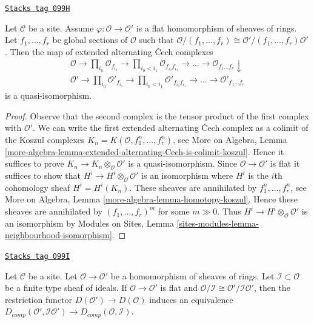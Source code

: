\begin{lemma}
\label{algebraization-lemma-map-identifies-koszul-and-cech-complexes}
\href{https://stacks.math.columbia.edu/tag/099H}{\texttt{Stacks tag 099H}}

Let $\mathcal{C}$ be a site.
Assume $\varphi : \mathcal{O} \to \mathcal{O}'$ is a flat homomorphism
of sheaves of rings. Let $f_1, \ldots, f_r$ be global sections
of $\mathcal{O}$ such that $\mathcal{O}/(f_1, \ldots, f_r) \cong
\mathcal{O}'/(f_1, \ldots, f_r)\mathcal{O}'$.
Then the map of extended alternating {\v C}ech complexes
$$
\begin{array}{c}\mathcal{O} \to
\prod_{i_0} \mathcal{O}_{f_{i_0}} \to
\prod_{i_0 < i_1} \mathcal{O}_{f_{i_0}f_{i_1}} \to \ldots \to
\mathcal{O}_{f_1\ldots f_r} \downarrow \\ \mathcal{O}' \to
\prod_{i_0} \mathcal{O}'_{f_{i_0}} \to
\prod_{i_0 < i_1} \mathcal{O}'_{f_{i_0}f_{i_1}} \to \ldots \to
\mathcal{O}'_{f_1\ldots f_r}\end{array}
$$
is a quasi-isomorphism.
\end{lemma}

\begin{proof}
Observe that the second complex is the tensor product of the first
complex with $\mathcal{O}'$. We can write the first extended
alternating {\v C}ech complex as a colimit of the Koszul complexes
$K_n = K(\mathcal{O}, f_1^n, \ldots, f_r^n)$, see
More on Algebra, Lemma
\ref{more-algebra-lemma-extended-alternating-Cech-is-colimit-koszul}.
Hence it suffices to prove $K_n \to K_n \otimes_\mathcal{O} \mathcal{O}'$
is a quasi-isomorphism. Since $\mathcal{O} \to \mathcal{O}'$ is flat
it suffices to show that $H^i \to H^i \otimes_\mathcal{O} \mathcal{O}'$
is an isomorphism where $H^i$ is the $i$th cohomology sheaf
$H^i = H^i(K_n)$. These sheaves are annihilated by $f_1^n, \ldots, f_r^n$, see
More on Algebra, Lemma \ref{more-algebra-lemma-homotopy-koszul}.
Hence these sheaves are annihilated by $(f_1, \ldots, f_r)^m$
for some $m \gg 0$. Thus $H^i \to H^i \otimes_\mathcal{O} \mathcal{O}'$
is an isomorphism by Modules on Sites, Lemma
\ref{sites-modules-lemma-neighbourhood-isomorphism}.
\end{proof}

\begin{lemma}
\label{algebraization-lemma-restriction-derived-complete-equivalence}
\href{https://stacks.math.columbia.edu/tag/099I}{\texttt{Stacks tag 099I}}

Let $\mathcal{C}$ be a site. Let $\mathcal{O} \to \mathcal{O}'$ be a
homomorphism of sheaves of rings. Let $\mathcal{I} \subset \mathcal{O}$
be a finite type sheaf of ideals.
If $\mathcal{O} \to \mathcal{O}'$ is flat and
$\mathcal{O}/\mathcal{I} \cong \mathcal{O}'/\mathcal{I}\mathcal{O}'$,
then the restriction functor $D(\mathcal{O}') \to D(\mathcal{O})$
induces an equivalence
$D_{comp}(\mathcal{O}', \mathcal{I}\mathcal{O}') \to
D_{comp}(\mathcal{O}, \mathcal{I})$.
\end{lemma}


